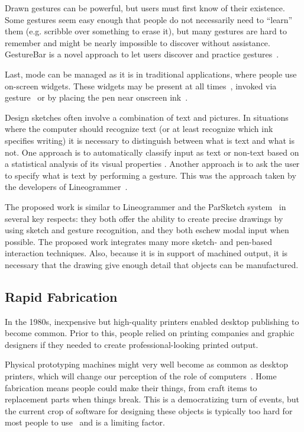 \documentclass[12pt]{article}
\begin{document}
Drawn gestures can be powerful, but users must first know of their
existence. Some gestures seem easy enough that people do not
necessarily need to ``learn'' them (e.g. scribble over something to
erase it), but many gestures are hard to remember and might be nearly
impossible to discover without assistance. GestureBar is a novel
approach to let users discover and practice
gestures~\cite{bragdon-gesturebar}.

Last, mode can be managed as it is in traditional applications, where
people use on-screen widgets. These widgets may be present at all
times~\cite{forbus-nusketch-battlespace}, invoked via
gesture~\cite{grossman-hover-widgets,kurtenbach-marking-menus} or by
placing the pen near onscreen
ink~\cite{marinkas-shadowbutton,grossman-handle-flag}.

Design sketches often involve a combination of text and pictures. In
situations where the computer should recognize text (or at least
recognize which ink specifies writing) it is necessary to distinguish
between what is text and what is not. One approach is to automatically
classify input as text or non-text based on a statistical analysis of
its visual properties \cite{patel-detect-text}. Another approach is to
ask the user to specify what is text by performing a gesture. This was
the approach taken by the developers of
Lineogrammer~\cite{zeleznik-lineogrammer}.

The proposed work is similar to Lineogrammer and the ParSketch
system~\cite{company-sketching-in-engineering,naya-parsketch} in
several key respects: they both offer the ability to create precise
drawings by using sketch and gesture recognition, and they both eschew
modal input when possible. The proposed work integrates many more
sketch- and pen-based interaction techniques. Also, because it is in
support of machined output, it is necessary that the drawing give
enough detail that objects can be manufactured.

\subsection{Rapid Fabrication}

In the 1980s, inexpensive but high-quality printers enabled desktop
publishing to become common. Prior to this, people relied on printing
companies and graphic designers if they needed to create
professional-looking printed output. 

Physical prototyping machines might very well become as common as
desktop printers, which will change our perception of the role of
computers~\cite{eisenberg-fab}. Home fabrication means people could
make their things, from craft items to replacement parts when things
break. This is a democratizing turn of events, but the current crop of
software for designing these objects is typically too hard for most
people to use~\cite{landay-design-tools} and is a limiting factor.
\end{document}

